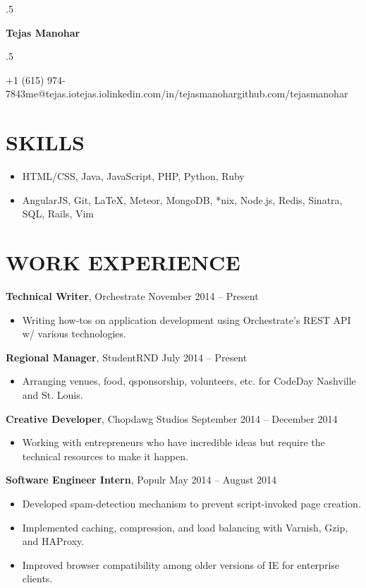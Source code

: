 \documentclass{res}
\newcommand*{\its}{\hspace{0.8cm}}
\begin{document}
\moveleft.5\hoffset\centerline{\Huge\bf Tejas Manohar}
\bigskip
\moveleft.5\hoffset\centerline{+1 (615) 974-7843\its{}me@tejas.io\its{}\its{}tejas.io\its{}linkedin.com/in/tejasmanohar\its{}github.com/tejasmanohar}

\section{SKILLS}

\begin{itemize} \itemsep -2pt
  \item HTML/CSS, Java, JavaScript, PHP, Python, Ruby
  \item AngularJS, Git, \LaTeX, Meteor, MongoDB, *nix, Node.js, Redis, Sinatra, SQL, Rails, Vim
\end{itemize}

\section{WORK EXPERIENCE}

{\bf Technical Writer}, Orchestrate \hfill November 2014 -- Present
\begin{itemize} \itemsep -2pt
  \item Writing how-tos on application development using Orchestrate's REST API w/ various technologies.
\end{itemize}

{\bf Regional Manager}, StudentRND \hfill July 2014 -- Present
\begin{itemize} \itemsep -2pt
  \item Arranging venues, food, qsponsorship, volunteers, etc. for CodeDay Nashville and St. Louis.
\end{itemize}

{\bf Creative Developer}, Chopdawg Studios \hfill September 2014 -- December 2014
\begin{itemize} \itemsep -2pt
  \item Working with entrepreneurs who have incredible ideas but require the technical resources to make it happen.
\end{itemize}

{\bf Software Engineer Intern}, Populr \hfill May 2014 -- August 2014
\begin{itemize} \itemsep -2pt
  \item Developed spam-detection mechanism to prevent script-invoked page creation.
  \item Implemented caching, compression, and load balancing with Varnish, Gzip, and HAProxy.
  \item Improved browser compatibility among older versions of IE for enterprise clients.
\end{itemize}
\end{document}

